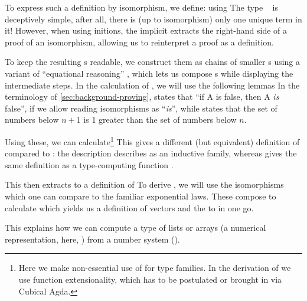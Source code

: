 To express such a definition by isomorphism, we define:
using
The type \  is deceptively simple, after all, there is (up to isomorphism) only one unique term in it! However, when using initions, the implicit  extracts the right-hand side of a proof of an isomorphism, allowing us to reinterpret a proof as a definition.

To keep the resulting s readable, we construct them as chains of smaller s using a variant of ``equational reasoning'' \cite{agdastdlib, plfa}, which lets us compose s while displaying the intermediate steps. In the calculation of , we will use the following lemmas
In the terminology of \autoref{sec:background-proving},  states that ``if A is false, then A \emph{is} false'', if we allow reading isomorphisms as ``\emph{is}'', while  states that the set of numbers below $n+1$ is 1 greater than the set of numbers below $n$.

Using these, we can calculate\footnote{Here we make non-essential use of  for type families. In the derivation of  we use function extensionality, which has to be postulated or brought in via Cubical Agda.}
This gives a different (but equivalent) definition of  compared to : the description  describes  as an inductive family, whereas  gives the same definition as a type-computing function \cite{progorn}.

This  then extracts to a definition of 
To derive , we will use the isomorphisms
which one can compare to the familiar exponential laws. These compose to calculate
which yields us a definition of vectors
and the  to  in one go.

This explains how we can compute a type of lists or arrays (a numerical representation, here, ) from a number system (\bN{}).


